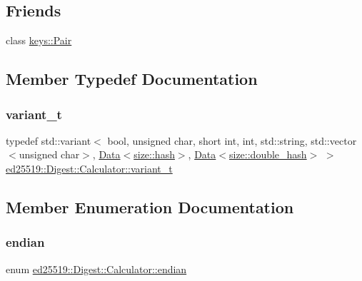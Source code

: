 \subsection*{Friends}
\begin{DoxyCompactItemize}
\item 
class \mbox{\hyperlink{structed25519_1_1_digest_1_1_calculator_ad89670fe663c8c8526b69b1bc6a87c19}{keys\+::\+Pair}}
\end{DoxyCompactItemize}


\subsection{Member Typedef Documentation}
\mbox{\label{structed25519_1_1_digest_1_1_calculator_a477919cc24c842e3cfe76f515ca5c946}} 
\subsubsection{\texorpdfstring{variant\_t}{variant\_t}}
{\footnotesize\ttfamily typedef std\+::variant$<$ bool, unsigned char, short int, int, std\+::string, std\+::vector$<$unsigned char$>$, \mbox{\hyperlink{classed25519_1_1_data}{Data}}$<$\mbox{\hyperlink{namespaceed25519_1_1size_a0c20525cc9711076ec093177a8e36c25}{size\+::hash}}$>$, \mbox{\hyperlink{classed25519_1_1_data}{Data}}$<$\mbox{\hyperlink{namespaceed25519_1_1size_ac853f864bb12792f88647a998c3c030f}{size\+::double\+\_\+hash}}$>$ $>$ \mbox{\hyperlink{structed25519_1_1_digest_1_1_calculator_a477919cc24c842e3cfe76f515ca5c946}{ed25519\+::\+Digest\+::\+Calculator\+::variant\+\_\+t}}}



\subsection{Member Enumeration Documentation}
\mbox{\label{structed25519_1_1_digest_1_1_calculator_a9bbea874787f93cdf4841b30c1c0d9a3}} 
\subsubsection{\texorpdfstring{endian}{endian}}
{\footnotesize\ttfamily enum \mbox{\hyperlink{structed25519_1_1_digest_1_1_calculator_a9bbea874787f93cdf4841b30c1c0d9a3}{ed25519\+::\+Digest\+::\+Calculator\+::endian}}}

